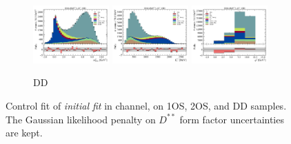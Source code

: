 \begin{figure}[htb]
    \begin{subfigure}{\textwidth}
        \includegraphics[width=0.32\textwidth]{./figs-supplemental-plots/init-fit/ctrl/fit_result-stacked-Dst-dd-mmiss2.pdf}
        \includegraphics[width=0.32\textwidth]{./figs-supplemental-plots/init-fit/ctrl/fit_result-stacked-Dst-dd-el.pdf}
        \includegraphics[width=0.32\textwidth]{./figs-supplemental-plots/init-fit/ctrl/fit_result-stacked-Dst-dd-q2.pdf}
        \caption{DD}
    \end{subfigure}
    \caption{
        Control fit of \emph{initial fit} in \Dstar channel,
        on 1OS, 2OS, and DD samples.
        The Gaussian likelihood penalty on $D^{**}$ form factor uncertainties
        are kept.
    }
    \label{fig:init-fit-ctrl-dst}
\end{figure}

